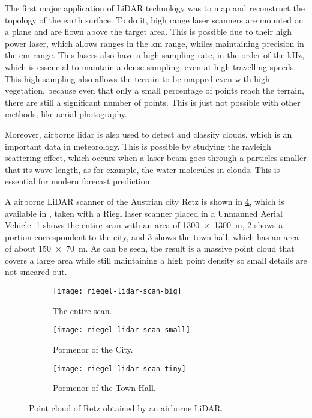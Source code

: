 The first major application of LiDAR technology was to map and reconstruct the topology of the earth surface. To do it, high range laser scanners are mounted on a plane and are flown above the target area. This is possible due to their high power laser, which allows ranges in the \si{\kilo\meter} range, whiles maintaining precision in the \si{\centi\meter} range. This lasers also have a high sampling rate, in the order of the \si{\kilo\hertz}, which is essencial to maintain a dense sampling, even at high travelling speeds. This high sampling also allows the terrain to be mapped even with high vegetation, because even that only a small percentage of points reach the terrain, there are still a significant number of points. This is just not possible with other methods, like aerial photography. 

Moreover, airborne lidar is also used to detect and classify clouds, which is an important data in meteorology. This is possible by studying the rayleigh scattering effect, which occurs when a laser beam goes through a particles smaller that its wave length, as for example, the water molecules in clouds.  This is essential for modern forecast prediction.

A airborne LiDAR scanner of the Austrian city Retz is shown in \cref{fig:riegl-lidar-scan}, which is available in \cite{potree-retz}, taken with a Riegl laser scanner placed in a Unmanned Aerial Vehicle. \cref{fig:riegl-lidar-scan-big} shows the entire scan with an area of \SI{1300 x 1300}{\meter}, \cref{fig:riegl-lidar-scan-small} shows a portion correspondent to the city, and \cref{fig:riegl-lidar-scan-tiny} shows the town hall, which has an area of about \SI{150 x 70}{\meter}. As can be seen, the result is a massive point cloud that covers a large area while still maintaining a high point density so small details are not smeared out. 

\begin{figure}[p]
    \centering
    \begin{subfigure}{\textwidth}
        \centering
        \texttt{[image: riegel-lidar-scan-big]}
        \caption{The entire scan.}
        \label{fig:riegl-lidar-scan-big}
    \end{subfigure}

    \centering
    \begin{subfigure}{\textwidth}
        \centering
        \texttt{[image: riegel-lidar-scan-small]}
        \caption{Pormenor of the City.}
        \label{fig:riegl-lidar-scan-small}
    \end{subfigure}

    \centering
    \begin{subfigure}{\textwidth}
        \centering
        \texttt{[image: riegel-lidar-scan-tiny]}
        \caption{Pormenor of the Town Hall.}
        \label{fig:riegl-lidar-scan-tiny}
    \end{subfigure}

    \caption{Point cloud of Retz obtained by an airborne LiDAR.}
    \label{fig:riegl-lidar-scan}
\end{figure}

